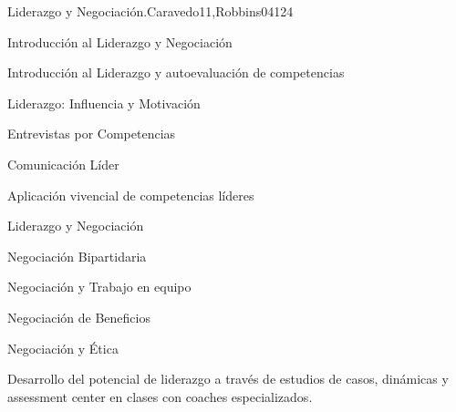 \begin{syllabus}
\begin{unit}{Liderazgo y Negociación.}{}{Caravedo11,Robbins04}{12}{4}
   \begin{topics}
      \item Introducción al Liderazgo y Negociación
      \item Introducción al Liderazgo y autoevaluación de competencias
      \item Liderazgo: Influencia y Motivación
      \item Entrevistas por Competencias
      \item Comunicación Líder
      \item Aplicación vivencial de competencias líderes
      \item Liderazgo y Negociación
      \item Negociación Bipartidaria
      \item Negociación y Trabajo en equipo
      \item Negociación de Beneficios
      \item Negociación y Ética
      
   \end{topics}
   \begin{learningoutcomes}
      \item Desarrollo del potencial de liderazgo a través de estudios de casos, dinámicas y assessment center en clases con coaches especializados.
   \end{learningoutcomes}
\end{unit}

\begin{coursebibliography}
\end{coursebibliography}

\end{syllabus}
